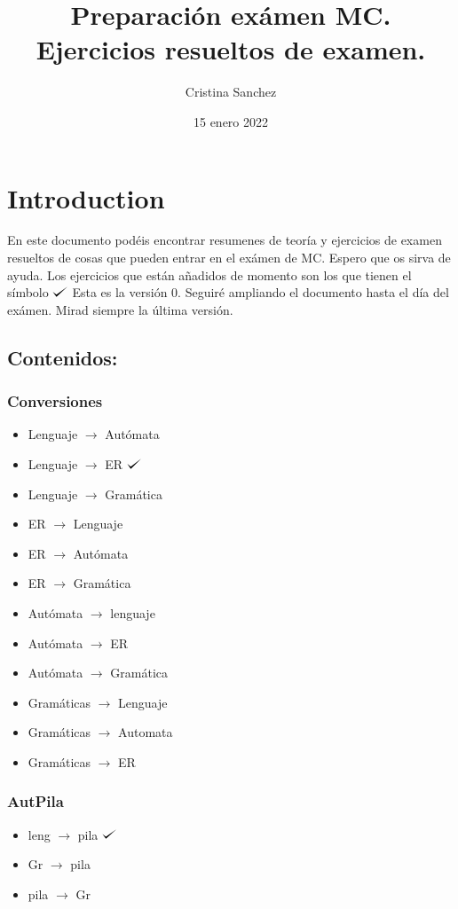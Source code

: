 \documentclass[12pt]{article}
\title{Preparación exámen MC. Ejercicios resueltos de examen.}
\author{Cristina Sanchez}
\date{15 enero 2022}
\def\checkmark{\tikz\fill[scale=0.4](0,.35) -- (.25,0) -- (1,.7) -- (.25,.15) -- cycle;}
\begin{document}
\maketitle

\newpage

\section{Introduction}
En este documento podéis encontrar resumenes de teoría y ejercicios de examen resueltos de cosas que pueden entrar en el exámen de MC. Espero que os sirva de ayuda. 
\newline
Los ejercicios que están añadidos de momento son los que tienen el símbolo $\checkmark$ 
Esta es la versión 0. Seguiré ampliando el documento hasta el día del exámen. Mirad siempre la última versión. 

\subsection{Contenidos:} 
\subsubsection{Conversiones}
\begin{itemize}
    \item Lenguaje $\rightarrow$ Autómata
    \item Lenguaje $\rightarrow$ ER $\checkmark$
    \item Lenguaje $\rightarrow$ Gramática 
    \item ER $\rightarrow$ Lenguaje 
    \item ER $\rightarrow$ Autómata 
    \item ER  $\rightarrow$  Gramática  
    \item Autómata  $\rightarrow$  lenguaje 
    \item Autómata  $\rightarrow$  ER
    \item Autómata  $\rightarrow$ Gramática
    \item Gramáticas  $\rightarrow$  Lenguaje 
    \item Gramáticas  $\rightarrow$  Automata  
    \item Gramáticas  $\rightarrow$  ER
\end{itemize}
\subsubsection{AutPila}
\begin{itemize}
    \item leng $\rightarrow$ pila $\checkmark$    
    \item Gr $\rightarrow$ pila 
    \item pila $\rightarrow$ Gr 
\end{itemize}
\end{document}
